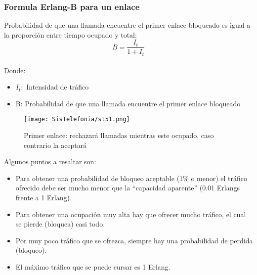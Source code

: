 \documentclass[
	12pt, %
	fleqn, %
	a4paper, %
	oneside, %
]{LegrandOrangeBook}
\begin{document}
\subsubsection{Formula Erlang-B para un enlace}
\begin{definition}[Probabilidad B]
Probabilidad de que una llamada encuentre el primer enlace bloqueado es igual a la proporción entre tiempo ocupado y total:
\begin{equation}
B=\frac{I_t}{1+I_t}
\end{equation}\\
Donde:
\begin{itemize}
\item $I_t:$ Intensidad de tráfico
\item B: Probabilidad de que una llamada encuentre el primer enlace bloqueado
\end{itemize}
\end{definition}
\begin{figure}[H]
\centering
\texttt{[image: SisTelefonia/st51.png]}
\caption{Primer enlace: rechazará llamadas mientras este ocupado, caso contrario la aceptará}
\label{fig:Gráfico Erlang-B para un enlace}
\end{figure}
Algunos puntos a resaltar son:
\begin{itemize}
\item Para obtener una probabilidad de bloqueo aceptable (1\% o menor) el tráfico ofrecido debe ser mucho menor que la “capacidad aparente” (0.01 Erlangs frente a 1 Erlang).
\item Para obtener una ocupación muy alta hay que ofrecer mucho tráfico, el cual se pierde (bloquea) casi todo.
\item Por muy poco tráfico que se ofrezca, siempre hay una probabilidad de perdida (bloqueo).
\item El máximo tráfico que se puede cursar es 1 Erlang.
\end{itemize}
\end{document}

